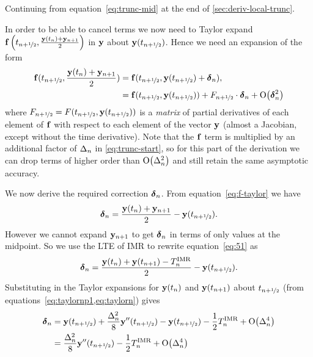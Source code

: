 Continuing from equation~\cref{eq:trunc-mid} at the end of \cref{sec:deriv-local-trunc}.

In order to be able to cancel terms we now need to Taylor expand ${\mathbf{f}}\left( t_{n+\nicefrac{1}{2}}, \frac{\mathbf{y}(t_n) + \mathbf{y}_{n+1}}{2} \right)$ in $\mathbf{y}$ about $\mathbf{y}(t_{n+\nicefrac{1}{2}})$.
Hence we need an expansion of the form
\begin{equation}
  \begin{aligned}
    \fv(\thf, \frac{\yv(t_n) + \yv_{n+1}}{2}) &= \fv(\thf, \yvhf + \dyn), \\
    &= \fv(\thf, \yvhf) + \dfdyhf \cdot \dyn  + \order{\dyn^2}
    \label{eq:f-taylor}
  \end{aligned}
\end{equation}
where $F_{n+\nicefrac{1}{2}} = F(t_{n+\nicefrac{1}{2}}, \mathbf{y}(t_{n+\nicefrac{1}{2}}))$ is a \emph{matrix} of partial derivatives of each element of ${\mathbf{f}}$ with respect to each element of the vector $\mathbf{y}$ (\ie almost a Jacobian, except without the time derivative).
Note that the ${\mathbf{f}}$ term is multiplied by an additional factor of $\Delta_{n}$ in \cref{eq:trunc-start}, so for this part of the derivation we can drop terms of higher order than $\text{O}{\left( \Delta_{n}^2 \right)}$ and still retain the same asymptotic accuracy.

We now derive the required correction $\mbox{\boldmath$\delta$}_{n}$.
From equation~\cref{eq:f-taylor} we have
\begin{equation}
  \dyn = \frac{\yv(t_n) + \yv_{n+1}}{2} - \yvhf.
  \label{eq:51}
\end{equation}
However we cannot expand $\mathbf{y}_{n+1}$ to get $\mbox{\boldmath$\delta$}_{n}$ in terms of only values at the midpoint.
So we use the LTE of IMR to rewrite equation~\cref{eq:51} as
\begin{equation}
  \mbox{\boldmath$\delta$}_{n} = \frac{\mathbf{y}(t_n) + \mathbf{y}(t_{n+1}) - T_n^{\text{IMR}}}{2} - \mathbf{y}(t_{n+\nicefrac{1}{2}}).
\end{equation}
Substituting in the Taylor expansions for $\mathbf{y}(t_n)$ and $\mathbf{y}(t_{n+1})$ about $t_{n+\nicefrac{1}{2}}$ (from equations~\cref{eq:taylornp1,eq:taylorn}) gives
\begin{equation}
  \begin{aligned}
    \dyn &= \yvhf + \frac{\dtn^2}{8} \yvhf[''] - \yvhf - \frac{1}{2} \lte^\imr + \order{\dtn^4}\\
    &= \frac{\dtn^2}{8} \yvhf[''] - \frac{1}{2} \lte^\imr + \order{\dtn^4}
    \label{eq:dy-value}
  \end{aligned}
\end{equation}



